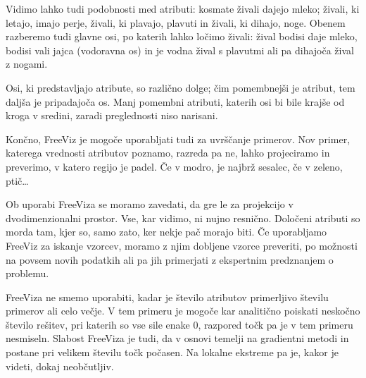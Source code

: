 Vidimo lahko tudi podobnosti med atributi: kosmate živali dajejo mleko; živali, ki letajo, imajo perje, živali, ki plavajo, plavuti in živali, ki dihajo, noge. Obenem razberemo tudi glavne osi, po katerih lahko ločimo živali: žival bodisi daje mleko, bodisi vali jajca (vodoravna os) in je vodna žival s plavutmi ali pa dihajoča žival z nogami.

Osi, ki predstavljajo atribute, so različno dolge; čim pomembnejši je atribut, tem daljša je pripadajoča os. Manj pomembni atributi, katerih osi bi bile krajše od kroga v sredini, zaradi preglednosti niso narisani.

Končno, FreeViz je mogoče uporabljati tudi za uvrščanje primerov. Nov primer, katerega vrednosti atributov poznamo, razreda pa ne, lahko projeciramo in preverimo, v katero regijo je padel. Če v modro, je najbrž sesalec, če v zeleno, ptič\ldots

Ob uporabi FreeViza se moramo zavedati, da gre le za projekcijo v dvodimenzionalni prostor. Vse, kar vidimo, ni nujno resnično. Določeni atributi so morda tam, kjer so, samo zato, ker nekje pač morajo biti. Če uporabljamo FreeViz za iskanje vzorcev, moramo z njim dobljene vzorce preveriti, po možnosti na povsem novih podatkih ali pa jih primerjati z ekspertnim predznanjem o problemu.

FreeViza ne smemo uporabiti, kadar je število atributov primerljivo številu primerov ali celo večje. V tem primeru je mogoče kar analitično poiskati neskočno število rešitev, pri katerih so vse sile enake 0, razpored točk pa je v tem primeru nesmiseln. Slabost FreeViza je tudi, da v osnovi temelji na gradientni metodi in postane pri velikem številu točk počasen. Na lokalne ekstreme pa je, kakor je videti, dokaj neobčutljiv.


\cleardoublepage


\endinput

\section{Singularni razcep}

Oglejmo si podatke šestih filmskih zanesenjakov in njihovih ocenah filmov v tabeli~\ref{t:romance-sf}. Že na prvi pogled lahko opazimo, da imam najbrž dve skupini ocenjevalcev in dve skupini filmov. Metka, Neža, Maja in Tina ne marajo znanstvene fantastike in jim je bolj blizu romantika. Alojz in Gašper pa rajši gledata znanstveno fantastiko in jima romantični filmi niso prav blizu.

